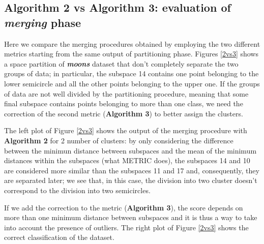 \documentclass[a4paper]{article}
\begin{document}
\subsection{Algorithm 2 vs Algorithm 3: evaluation of \emph{merging} phase}

Here we compare the merging procedures obtained by employing the two different metrics starting from the same output of partitioning phase.
Figures \ref{2vs3} shows a space partition of \emph{\textbf{moons}} dataset that don't completely separate the two groups of data;
in particular, the subspace 14 contains one point belonging to the lower semicircle and all the other points belonging to the upper one.
If the groups of data are not well divided by the partitioning procedure, meaning that some final subspace contains points belonging to more than one class, we need the correction of the second metric (\textbf{Algorithm 3}) to better assign the clusters.

The left plot of Figure \ref{2vs3} shows the output of the merging procedure with \textbf{Algorithm 2} for 2 number of clusters:
by only considering the difference between the minimun distance between subspaces and the mean of the minimum distances within the subspaces (what METRIC does), the subspaces 14 and 10 are considered more similar than the subspaces 11 and 17 and, consequently, they are separated later;
we see that, in this case, the division into two cluster doesn't correspond to the division into two semicircles.

If we add the correction to the metric (\textbf{Algorithm 3}), the score depends on more than one minimum distance between subspaces and it is thus a way to take into account the presence of outliers.
The right plot of Figure \ref{2vs3} shows the correct classification of the dataset.
\end{document}
